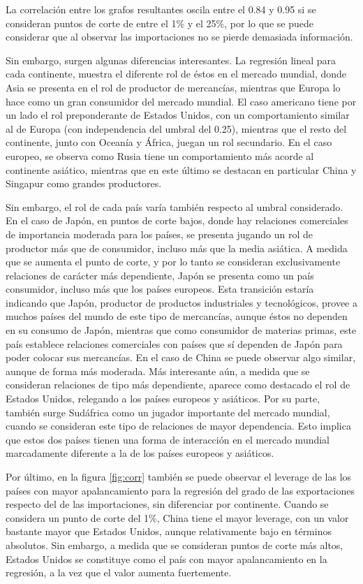\documentclass[a4paper]{article}
\begin{document}
La correlación entre los grafos resultantes oscila entre el 0.84 y 0.95 si se consideran puntos de corte de entre el 1\% y el 25\%, por lo que se puede considerar que al observar las importaciones no se pierde demasiada información.

Sin embargo, surgen algunas diferencias interesantes. La regresión lineal para cada continente, muestra el diferente rol de éstos en el mercado mundial, donde Asia se presenta en el rol de productor de mercancías, mientras que Europa lo hace como un gran consumidor del mercado mundial. El caso americano tiene por un lado el rol preponderante de Estados Unidos, con un comportamiento similar al de Europa (con independencia del umbral del 0.25), mientras que el resto del continente, junto con Oceanía y África, juegan un rol secundario. En el caso europeo, se observa como Rusia tiene un comportamiento más acorde al continente asiático, mientras que en este último se destacan en particular China y Singapur como grandes productores.      

Sin embargo, el rol de cada país varía también respecto al umbral considerado. En el caso de Japón, en puntos de corte bajos, donde hay relaciones comerciales de importancia moderada para los países, se presenta jugando un rol de productor más que de consumidor, incluso más que la media asiática. A medida que se aumenta el punto de corte, y por lo tanto se consideran exclusivamente relaciones de carácter más dependiente, Japón se presenta como un país consumidor, incluso más que los países europeos. Esta transición estaría indicando que Japón, productor de productos industriales y tecnológicos, provee a muchos países del mundo de este tipo de mercancías, aunque éstos no dependen en su consumo de Japón, mientras que como consumidor de materias primas, este país establece relaciones comerciales con países que sí dependen de Japón para poder colocar sus mercancías. En el caso de China se puede observar algo similar, aunque de forma más moderada. Más interesante aún, a medida que se consideran relaciones de tipo más dependiente, aparece como destacado el rol de Estados Unidos, relegando a los países europeos y asiáticos. Por su parte, también surge Sudáfrica como un jugador importante del mercado mundial, cuando se consideran este tipo de relaciones de mayor dependencia. Esto implica que estos dos países tienen una forma de interacción en el mercado mundial marcadamente diferente a la de los países europeos y asiáticos.       

Por último, en la figura \ref{fig:corr} también se puede observar el leverage de las los países con mayor apalancamiento para la regresión del grado de las exportaciones respecto del de las importaciones, sin diferenciar por continente. Cuando se considera un punto de corte del 1\%, China tiene el mayor leverage, con un valor bastante mayor que Estados Unidos, aunque relativamente bajo en términos absolutos. Sin embargo, a medida que se consideran puntos de corte más altos, Estados Unidos se constituye como el país con mayor apalancamiento en la regresión, a la vez que el valor aumenta fuertemente.      
\end{document}
